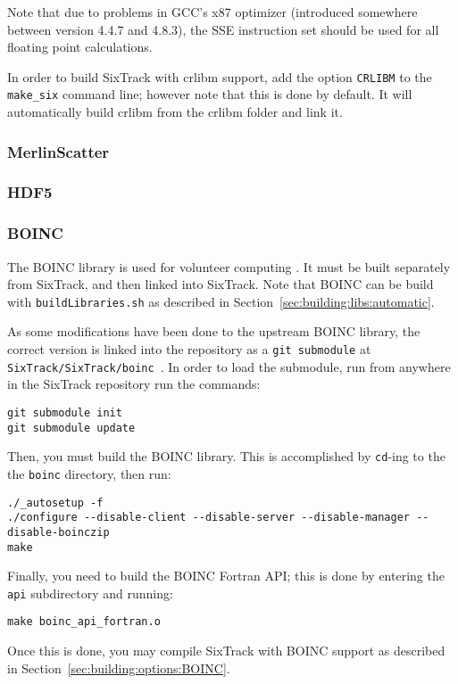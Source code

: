 \documentclass[english,BCOR=0mm,DIV=18]{scrartcl}
\begin{document}
Note that due to problems in GCC's x87 optimizer (introduced somewhere between version 4.4.7 and 4.8.3), the SSE instruction set should be used for all floating point calculations.

In order to build SixTrack with crlibm support, add the option \texttt{CRLIBM} to the \texttt{make\_six} command line; however note that this is done by default.
It will automatically build crlibm from the crlibm folder and link it.

\subsubsection{MerlinScatter}

\subsubsection{HDF5}

\subsubsection{BOINC}
\label{sec:building:libs:BOINC}
The BOINC library is used for volunteer computing .
It must be built separately from SixTrack, and then linked into SixTrack.
Note that BOINC can be build with \texttt{buildLibraries.sh} as described in Section~\ref{sec:building:libs:automatic}.

As some modifications have been done to the upstream BOINC library, the correct version is linked into the repository as a \texttt{git submodule}  at \texttt{SixTrack/SixTrack/boinc}~.
In order to load the submodule, run from anywhere in the SixTrack repository run the commands:
\begin{lstlisting}
git submodule init
git submodule update
\end{lstlisting}

Then, you must build the BOINC library.
This is accomplished by \texttt{cd}-ing to the the \texttt{boinc} directory, then run:
\begin{lstlisting}
./_autosetup -f
./configure --disable-client --disable-server --disable-manager --disable-boinczip
make
\end{lstlisting}
Finally, you need to build the BOINC Fortran API; this is done by entering the \texttt{api} subdirectory and running:
\begin{lstlisting}
make boinc_api_fortran.o
\end{lstlisting}
Once this is done, you may compile SixTrack with BOINC support as described in Section~\ref{sec:building:options:BOINC}.
\end{document}
